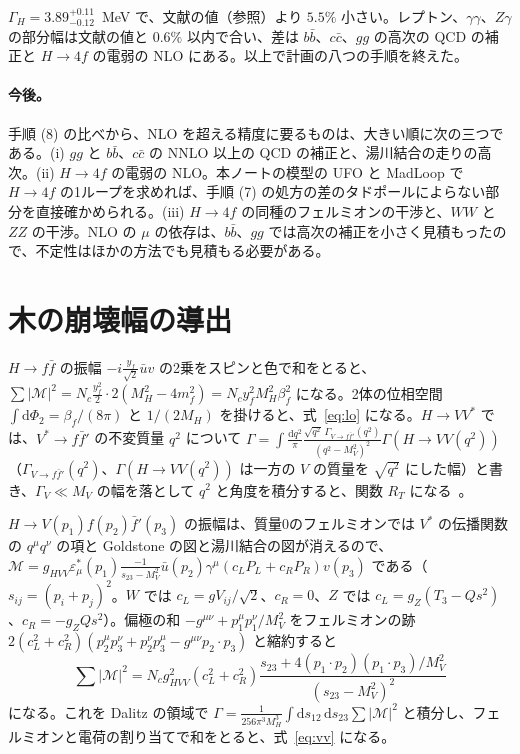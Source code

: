 \documentclass[a4paper,10pt]{ltjsarticle}
\newcommand{\dd}{\mathrm{d}}
\begin{document}
$\Gamma_H=3.89^{+0.11}_{-0.12}$~MeV で、文献の値（参照）より $5.5\%$ 小さい。レプトン、$\gamma\gamma$、$Z\gamma$ の部分幅は文献の値と $0.6\%$ 以内で合い、差は $b\bar b$、$c\bar c$、$gg$ の高次の QCD の補正と $H\to4f$ の電弱の NLO にある。以上で計画の八つの手順を終えた。

\paragraph{今後。}手順 (8) の比べから、NLO を超える精度に要るものは、大きい順に次の三つである。(i) $gg$ と $b\bar b$、$c\bar c$ の NNLO 以上の QCD の補正と、湯川結合の走りの高次。(ii) $H\to4f$ の電弱の NLO。本ノートの模型の UFO と MadLoop で $H\to4f$ の1ループを求めれば、手順 (7) の処方の差のタドポールによらない部分を直接確かめられる。(iii) $H\to4f$ の同種のフェルミオンの干渉と、$WW$ と $ZZ$ の干渉。NLO の $\mu$ の依存は、$b\bar b$、$gg$ では高次の補正を小さく見積もったので、不定性はほかの方法でも見積もる必要がある。

\appendix

\section{木の崩壊幅の導出}\label{app:lo}

$H\to f\bar f$ の振幅 $-i\frac{y_f}{\sqrt2}\bar uv$ の2乗をスピンと色で和をとると、$\sum|\mathcal M|^2=N_c\frac{y_f^2}2\cdot2(M_H^2-4m_f^2)=N_cy_f^2M_H^2\beta_f^2$ になる。2体の位相空間 $\int\dd\Phi_2=\beta_f/(8\pi)$ と $1/(2M_H)$ を掛けると、式~\eqref{eq:lo} になる。$H\to VV^*$ では、$V^*\to f\bar f'$ の不変質量 $q^2$ について $\Gamma=\int\frac{\dd q^2}\pi\frac{\sqrt{q^2}\,\Gamma_{V\to f\bar f'}(q^2)}{(q^2-M_V^2)^2}\Gamma(H\to VV(q^2))$（$\Gamma_{V\to f\bar f'}(q^2)$、$\Gamma(H\to VV(q^2))$ は一方の $V$ の質量を $\sqrt{q^2}$ にした幅）と書き、$\Gamma_V\ll M_V$ の幅を落として $q^2$ と角度を積分すると、関数 $R_T$ になる~\cite{km84}。

$H\to V(p_1)f(p_2)\bar f'(p_3)$ の振幅は、質量0のフェルミオンでは $V^*$ の伝播関数の $q^\mu q^\nu$ の項と Goldstone の図と湯川結合の図が消えるので、$\mathcal M=g_{HVV}\varepsilon^*_\mu(p_1)\frac{-1}{s_{23}-M_V^2}\bar u(p_2)\gamma^\mu(c_LP_L+c_RP_R)v(p_3)$ である（$s_{ij}=(p_i+p_j)^2$。$W$ では $c_L=gV_{ij}/\sqrt2$、$c_R=0$、$Z$ では $c_L=g_Z(T_3-Qs^2)$、$c_R=-g_ZQs^2$）。偏極の和 $-g^{\mu\nu}+p_1^\mu p_1^\nu/M_V^2$ をフェルミオンの跡 $2(c_L^2+c_R^2)(p_2^\mu p_3^\nu+p_2^\nu p_3^\mu-g^{\mu\nu}p_2\cdot p_3)$ と縮約すると
\begin{equation}
\sum|\mathcal M|^2=N_cg_{HVV}^2(c_L^2+c_R^2)\frac{s_{23}+4(p_1\cdot p_2)(p_1\cdot p_3)/M_V^2}{(s_{23}-M_V^2)^2}
\label{eq:hvffhand}
\end{equation}
になる。これを Dalitz の領域で $\Gamma=\frac1{256\pi^3M_H^3}\int\dd s_{12}\,\dd s_{23}\sum|\mathcal M|^2$ と積分し、フェルミオンと電荷の割り当てで和をとると、式~\eqref{eq:vv} になる。
\end{document}
